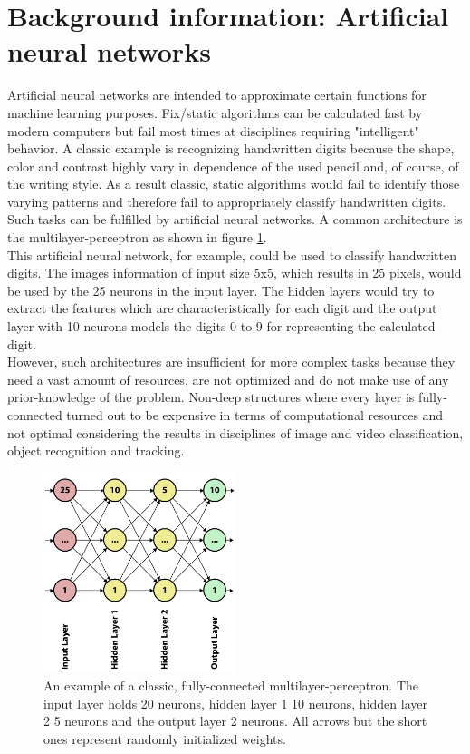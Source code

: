 \documentclass[12pt,twoside]{article}
\theoremstyle{plain}
\theoremstyle{definition}
\theoremstyle{remark}
\begin{document}
\section{Background information: Artificial neural networks}
\label{sec:ann}

Artificial neural networks are intended to approximate certain functions for machine learning purposes. Fix/static algorithms can be calculated fast by modern computers but fail most times at disciplines requiring "intelligent" behavior. A classic example is recognizing handwritten digits because the shape, color and contrast highly vary in dependence of the used pencil and, of course, of the writing style. As a result classic, static algorithms would fail to identify those varying patterns and therefore fail to appropriately classify handwritten digits.
\\
Such tasks can be fulfilled by artificial neural networks. A common architecture is the multilayer-perceptron as shown in figure \ref{fig:mlp1}.
\\
This artificial neural network, for example, could be used to classify handwritten digits. The images information of input size 5x5, which results in 25 pixels, would be used by the 25 neurons in the input layer. The hidden layers would try to extract the features which are characteristically for each digit and the output layer with 10 neurons models the digits 0 to 9 for representing the calculated digit.
\\
However, such architectures are insufficient for more complex tasks because they need a vast amount of resources, are not optimized and do not make use of any prior-knowledge of the problem. Non-deep structures where every layer is fully-connected turned out to be expensive in terms of computational resources and not optimal considering the results in disciplines of image and video classification, object recognition and tracking.

\begin{figure}[H]
	\centerline{
		\includegraphics[width=0.5\textwidth]{neuralnet1.pdf}
	}
	{\caption{An example of a classic, fully-connected multilayer-perceptron. The input layer holds 20 neurons, hidden layer 1 10 neurons, hidden layer 2 5 neurons and the output layer 2 neurons. All arrows but the short ones represent randomly initialized weights.}\label{fig:mlp1}}
\end{figure}
\end{document}

